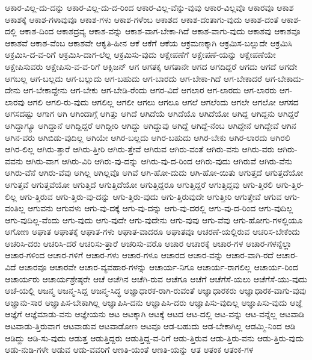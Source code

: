 {ಆಕಾರ-ವಿಲ್ಲ-ದು-ದನ್ನು
ಆಕಾರ-ವಿಲ್ಲ-ದು-ದ-ರಿಂದ
ಆಕಾರ-ವಿಲ್ಲ-ವೆನ್ನು-ವುವು
ಆಕಾರ-ವಿಲ್ಲವೊ
ಆಕಾರವೂ
ಆಕಾಶ
ಆಕಾಶಕ್ಕೆ
ಆಕಾಶ-ಗಳಾವುವೂ
ಆಕಾಶ-ಗಳು
ಆಕಾಶ-ಗಳೆಂಬ
ಆಕಾಶದ
ಆಕಾಶ-ದಂತಾಗು-ವುದು
ಆಕಾಶ-ದಂತೆ
ಆಕಾಶ-ದಲ್ಲಿ
ಆಕಾಶ-ದಿಂದ
ಆಕಾಶದ್ರವ್ಯ
ಆಕಾಶ-ವನ್ನು
ಆಕಾಶ-ವಾಗ-ಬೇಕಾ-ಗಿದೆ
ಆಕಾಶ-ವಾಗು-ವುದು
ಆಕಾಶವು
ಆಕಾಶವೂ
ಆಕಾಶವೆ
ಆಕಾಶ-ವೆಂಬ
ಆಕಾಶವೇ
ಆಕೃತಿ-ಹೀನ
ಆಕೆ
ಆಕೆಗೆ
ಆಕೆಯ
ಆಕ್ರಮಣಕ್ಕಾಗಿ
ಆಕ್ರಮಿಸ-ಬಲ್ಲುದೇ
ಆಕ್ರಮಿಸಿ
ಆಕ್ರಮಿಸಿ-ದ-ವ-ರಿಗೆ
ಆಕ್ರಮಿಸಿ-ದಾಗ-ಲೆಲ್ಲ
ಆಕ್ರಮಿಸು-ವುದು
ಆಕ್ಷೇಪಣೆಗೆ
ಆಕ್ಷೇಪಣೆ-ಯನ್ನು
ಆಕ್ಷೇಪಣೆಯೇ
ಆಕ್ಷೇಪಿಸುವರು
ಆಕ್ಷೇಪಿಸು-ವ-ವ-ರಿಗೆ
ಆಕ್ಸಿಜನ್
ಆಗ
ಆಗತಕ್ಕ
ಆಗತಾನೇ
ಆಗದ
ಆಗದಿದ್ದರೆ
ಆಗದು
ಆಗದೆ
ಆಗದೇ
ಆಗಬಲ್ಲ
ಆಗ-ಬಲ್ಲದು
ಆಗ-ಬಲ್ಲುದು
ಆಗ-ಬಹುದು
ಆಗ-ಬಾರದು
ಆಗ-ಬೇಕಾ-ಗಿದೆ
ಆಗ-ಬೇಕಾದರೆ
ಆಗ-ಬೇಕಾದು-ದೇನು
ಆಗ-ಬೇಕಾದ್ದೇನು
ಆಗ-ಬೇಕು
ಆಗ-ಬೇಡಿ-ರೆಂದು
ಆಗರ-ವಿದೆ
ಆಗಲಾರ
ಆಗ-ಲಾರದು
ಆಗ-ಲಾರರು
ಆಗ-ಲಾರವು
ಆಗಲಿ
ಆಗಲಿ-ರು-ವುದು
ಆಗಲಿಲ್ಲ
ಆಗಲೀ
ಆಗಲು
ಆಗಲೂ
ಆಗಲೆ
ಆಗಲೆಂದು
ಆಗಲೇ
ಆಗಲೋ
ಆಗಸದ
ಆಗಸದಷ್ಟು
ಆಗಾಗ
ಆಗಿ
ಆಗಿಂದಾಗ್ಗೆ
ಆಗಿತ್ತು
ಆಗಿದೆ
ಆಗಿದೆಯೆ
ಆಗಿದೆಯೊ
ಆಗಿದೆಯೋ
ಆಗಿದ್ದ
ಆಗಿದ್ದನು
ಆಗಿದ್ದರೆ
ಆಗಿದ್ದಾಗ್ಯೂ
ಆಗಿದ್ದಾನೆ
ಆಗಿದ್ದಿದ್ದರೆ
ಆಗಿದ್ದೀರಿ
ಆಗಿದ್ದು
ಆಗಿದ್ದುವು
ಆಗಿದ್ದೆ
ಆಗಿದ್ದೆ-ನೆಂಬ
ಆಗಿದ್ದೇನೆ
ಆಗಿದ್ದೇವೆ
ಆಗಿನ
ಆಗಿನ-ವರು
ಆಗಿಬಿಡು-ವುದಿಲ್ಲ
ಆಗಿಯೇ
ಆಗಿರ-ಬಲ್ಲದು
ಆಗಿರ-ಬಹುದು
ಆಗಿರ-ಬೇಕು
ಆಗಿರ-ಲಾರದು
ಆಗಿರಲಿ
ಆಗಿರ-ಲಿಲ್ಲ
ಆಗಿರು-ತ್ತಾರೆ
ಆಗಿರು-ತ್ತೀರಿ
ಆಗಿರು-ತ್ತೇವೆ
ಆಗಿರುವ
ಆಗಿರು-ವಂತೆ
ಆಗಿರು-ವನು
ಆಗಿರು-ವರು
ಆಗಿರು-ವವನು
ಆಗಿರು-ವಾಗ
ಆಗಿರು-ವಿರಿ
ಆಗಿರು-ವು-ದನ್ನು
ಆಗಿರು-ವು-ದ-ರಿಂದ
ಆಗಿರು-ವುದು
ಆಗಿರುವೆ
ಆಗಿರು-ವೆನು
ಆಗಿರು-ವೆನೆ
ಆಗಿರು-ವೆವು
ಆಗಿಲ್ಲ
ಆಗಿಲ್ಲವೊ
ಆಗಿವೆ
ಆಗಿ-ಹೋ-ದುದು
ಆಗಿ-ಹೋ-ಯಿತು
ಆಗುತ್ತದೆ
ಆಗುತ್ತದೆಯೋ
ಆಗುತ್ತವೆ
ಆಗುತ್ತವೆಯೋ
ಆಗುತ್ತಿದೆ
ಆಗುತ್ತಿದೆಯೋ
ಆಗುತ್ತಿದ್ದರೂ
ಆಗುತ್ತಿದ್ದರೆ
ಆಗುತ್ತಿದ್ದವು
ಆಗು-ತ್ತಿರಲಿ
ಆಗು-ತ್ತಿರ-ಲಿಲ್ಲ
ಆಗು-ತ್ತಿರುವ
ಆಗು-ತ್ತಿರು-ವು-ದನ್ನು
ಆಗು-ತ್ತಿರು-ವುದು
ಆಗು-ತ್ತಿರುವುದೇ
ಆಗುತ್ತೀರಿ
ಆಗುತ್ತೇವೆ
ಆಗುವ
ಆಗು-ವಂತಿಲ್ಲ
ಆಗುವನು
ಆಗುವಳು
ಆಗು-ವು-ದಕ್ಕೆ
ಆಗು-ವು-ದನ್ನು
ಆಗು-ವು-ದರಲ್ಲಿ
ಆಗು-ವು-ದ-ರಿಂದ
ಆಗು-ವುದಿಲ್ಲ
ಆಗು-ವುದಿಲ್ಲ-ವೆಂದು
ಆಗು-ವುದು
ಆಗು-ವುದೇ
ಆಗು-ವುದೇನು
ಆಗು-ವುವು
ಆಗು-ವೆವು
ಆಗು-ಹೋಗು-ಗಳಲ್ಲಿಯೂ
ಆಗೋಣ
ಆಘಾತ
ಆಘಾತಕ್ಕೆ
ಆಘಾತ-ಗಳು
ಆಘಾತ-ವಾದರೂ
ಆಘಾತವೂ
ಆಚರಣೆ-ಯಲ್ಲಿರುವ
ಆಚರಿಸ-ಬೇಕೆಂದು
ಆಚರಿಸಿ-ದರು
ಆಚರಿಸಿ-ದರೆ
ಆಚರಿಸು-ತ್ತಾರೆ
ಆಚರಿಸು-ವರೊ
ಆಚಾರ
ಆಚಾರಕ್ಕೆ
ಆಚಾರ-ಗಳ
ಆಚಾರ-ಗಳನ್ನೆಲ್ಲಾ
ಆಚಾರ-ಗಳಿಂದ
ಆಚಾರ-ಗಳಿಗೆ
ಆಚಾರ-ಗಳು
ಆಚಾರ-ಗಳೂ
ಆಚಾರದ
ಆಚಾರ-ವನ್ನು
ಆಚಾರ-ವಾಗಿ-ರದೆ
ಆಚಾರ-ವಿದೆ
ಆಚಾರವೂ
ಆಚಾರವೇ
ಆಚಾರ-ವ್ಯವಹಾರ-ಗಳನ್ನು
ಆಚಾರ್ಯ-ನಿಗೂ
ಆಚಾರ್ಯ-ರಾಗಲಿಲ್ಲ
ಆಚಾರ್ಯ-ರಿಂದ
ಆಚಾರ್ಯರು
ಆಚಾರ್ಯಶ್ರೇಷ್ಠರೇ
ಆಚೆ
ಆಚೆಗಿನ
ಆಚೆಗಿ-ರುವ
ಆಚೆಗೂ
ಆಚೆಗೆ
ಆಚೆಗೆಸೆ-ಯಲು
ಆಚೆಗೆಸೆ-ಯು-ವುದು
ಆಚೆ-ಯಲ್ಲಿ
ಆಜನ್ಮ
ಆಜನ್ಮ-ಸಿದ್ದ
ಆಜನ್ಮ-ಸಿದ್ಧ
ಆಜ್ಞಾಧಾರಕ-ರಾಗಿ-ರುವಂತೆ
ಆಜ್ಞಾಧಾರಕರು
ಆಜ್ಞಾಧಾರಕ-ವಾಗು-ವುವು
ಆಜ್ಞಾನು-ಸಾರ
ಆಜ್ಞಾಪಿಸ-ಬೇಕಾಗಿಲ್ಲ
ಆಜ್ಞಾಪಿಸಿ-ದನು
ಆಜ್ಞಾಪಿಸಿ-ದರು
ಆಜ್ಞಾಪಿಸು-ವುದಿಲ್ಲ
ಆಜ್ಞಾಪಿಸು-ವುದು
ಆಜ್ಞೆ
ಆಜ್ಞೆಗೆ
ಆಜ್ಞೆಮಾಡು-ವನು
ಆಜ್ಞೇಯನು
ಆಟ
ಆಟಕ್ಕಾಗಿ
ಆಟಕ್ಕೆ
ಆಟದ
ಆಟ-ದಲ್ಲಿ
ಆಟ-ವನ್ನು
ಆಟ-ವನ್ನೆಲ್ಲ
ಆಟವಾಡಿ
ಆಟವಾಡು-ತ್ತಿರುವಾಗ
ಆಟವಾಡುವ
ಆಟವಾಡೋಣ
ಆಟವೂ
ಆಡ-ಬಹುದು
ಆಡ-ಬೇಕಾಗಿಲ್ಲ
ಆಡಮ್ಮಿ-ನಿಂದ
ಆಡಿ
ಆಡಿದ್ದು
ಆಡಿ-ಸು-ವುದು
ಆಡುತ್ತ
ಆಡುತ್ತಿದ್ದರು
ಆಡುತ್ತಿದ್ದ-ವ-ರಿಗೆ
ಆಡು-ತ್ತಿರುವ
ಆಡು-ತ್ತಿರು-ವನು
ಆಡು-ತ್ತಿರು-ವುದು
ಆಡು-ನುಡಿ-ಗಳೇ
ಆಡುವ
ಆಡು-ವವರಿಗೆ
ಆಣತಿ-ಯಂತೆ
ಆಣತಿ-ಯನ್ನು
ಆತ
ಆತಂಕ
ಆತಂಕ-ಗಳ
}
